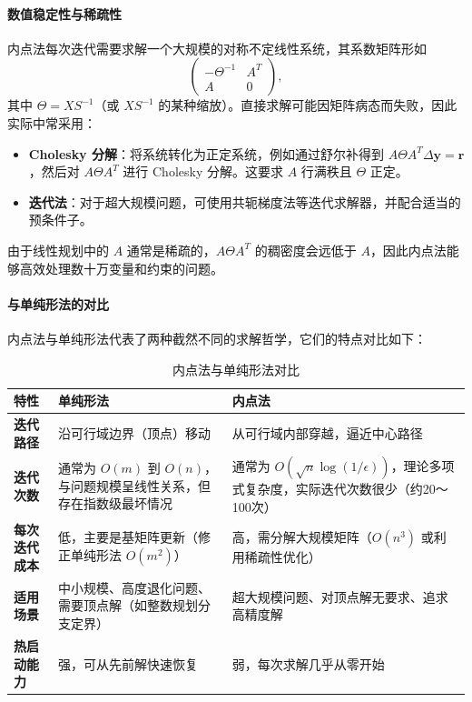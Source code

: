 \documentclass[12pt]{article}
\theoremstyle{plain}
\theoremstyle{definition}
\begin{document}
\paragraph{数值稳定性与稀疏性}
内点法每次迭代需要求解一个大规模的对称不定线性系统，其系数矩阵形如
\[
\begin{pmatrix}
-\Theta^{-1} & A^T \\
A & 0
\end{pmatrix},
\]
其中 $\Theta = X S^{-1}$（或 $X S^{-1}$ 的某种缩放）。直接求解可能因矩阵病态而失败，因此实际中常采用：
\begin{itemize}
    \item \textbf{Cholesky 分解}：将系统转化为正定系统，例如通过舒尔补得到 $A \Theta A^T \Delta \bm{y} = \bm{r}$，然后对 $A \Theta A^T$ 进行 Cholesky 分解。这要求 $A$ 行满秩且 $\Theta$ 正定。
    \item \textbf{迭代法}：对于超大规模问题，可使用共轭梯度法等迭代求解器，并配合适当的预条件子。
\end{itemize}
由于线性规划中的 $A$ 通常是稀疏的，$A \Theta A^T$ 的稠密度会远低于 $A$，因此内点法能够高效处理数十万变量和约束的问题。

\paragraph{与单纯形法的对比}
内点法与单纯形法代表了两种截然不同的求解哲学，它们的特点对比如下：

\begin{table}[!htbp]
\centering
\caption{内点法与单纯形法对比}
\begin{tabular}{l|p{6cm}|p{6cm}}
\toprule
\textbf{特性} & \textbf{单纯形法} & \textbf{内点法} \\
\midrule
\textbf{迭代路径} & 沿可行域边界（顶点）移动 & 从可行域内部穿越，逼近中心路径 \\
\textbf{迭代次数} & 通常为 $O(m)$ 到 $O(n)$，与问题规模呈线性关系，但存在指数级最坏情况 & 通常为 $O(\sqrt{n}\log(1/\epsilon))$，理论多项式复杂度，实际迭代次数很少（约20～100次） \\
\textbf{每次迭代成本} & 低，主要是基矩阵更新（修正单纯形法 $O(m^2)$） & 高，需分解大规模矩阵（$O(n^3)$ 或利用稀疏性优化） \\
\textbf{适用场景} & 中小规模、高度退化问题、需要顶点解（如整数规划分支定界） & 超大规模问题、对顶点解无要求、追求高精度解 \\
\textbf{热启动能力} & 强，可从先前解快速恢复 & 弱，每次求解几乎从零开始 \\
\bottomrule
\end{tabular}
\end{table}
\end{document}
